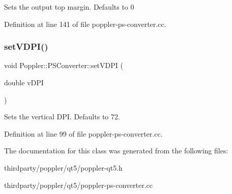 Sets the output top margin. Defaults to 0 

Definition at line 141 of file poppler-\/ps-\/converter.\+cc.

\mbox{\label{class_poppler_1_1_p_s_converter_a77d7cb4807c5b1661e2483927ae9954d}} 
\subsubsection{\texorpdfstring{set\+V\+D\+P\+I()}{setVDPI()}}
{\footnotesize\ttfamily void Poppler\+::\+P\+S\+Converter\+::set\+V\+D\+PI (\begin{DoxyParamCaption}\item[{double}]{v\+D\+PI }\end{DoxyParamCaption})}

Sets the vertical D\+PI. Defaults to 72. 

Definition at line 99 of file poppler-\/ps-\/converter.\+cc.



The documentation for this class was generated from the following files\+:\begin{DoxyCompactItemize}
\item 
thirdparty/poppler/qt5/poppler-\/qt5.\+h\item 
thirdparty/poppler/qt5/poppler-\/ps-\/converter.\+cc\end{DoxyCompactItemize}
